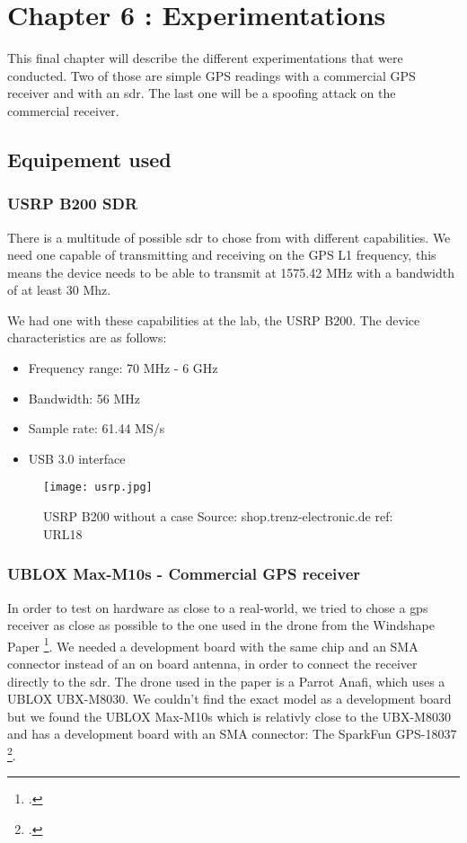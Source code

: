 \chapter{Chapter 6 : Experimentations}

This final chapter will describe the different experimentations that were conducted. Two of those are simple GPS readings with a commercial GPS receiver and with an \gls{sdr}. The last one will be a spoofing attack on the commercial receiver.

\section{Equipement used}

\subsection{USRP B200 SDR}
There is a multitude of possible \gls{sdr} to chose from with different capabilities. We need one capable of transmitting and receiving on the GPS L1 frequency, this means the device needs to be able to transmit at 1575.42 MHz with a bandwidth of at least 30 Mhz.

We had one with these capabilities at the lab, the USRP B200. The device characteristics are as follows:
\begin{itemize}
	\item Frequency range: 70 MHz - 6 GHz
	\item Bandwidth: 56 MHz
	\item Sample rate: 61.44 MS/s
	\item USB 3.0 interface
\end{itemize}

\begin{figure}[H]
	\centering
	\texttt{[image: usrp.jpg]}
	\caption[USRP B200 without a case]{USRP B200 without a case Source: shop.trenz-electronic.de ref: URL18}
	\label{fig:usrp}
\end{figure}

\subsection{UBLOX Max-M10s - Commercial GPS receiver}

In order to test on hardware as close to a real-world, we tried to chose a \gls{gps} receiver as close as possible to the one used in the drone from the Windshape Paper \footcite{catry_development_2022}.
We needed a development board with the same chip and an SMA connector instead of an on board antenna, in order to connect the receiver directly to the \gls{sdr}. The drone used in the paper is a Parrot Anafi, which uses a UBLOX UBX-M8030. We couldn't find the exact model as a development board but we found the UBLOX Max-M10s which is relativly close to the UBX-M8030 and has a development board with an SMA connector: The SparkFun GPS-18037 \footcite{noauthor_gps-18037_nodate}.

